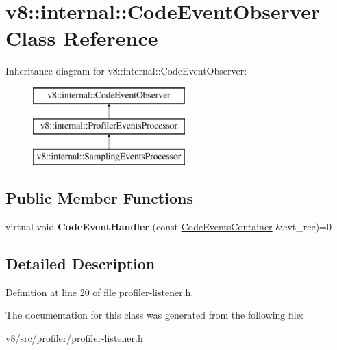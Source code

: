 \hypertarget{classv8_1_1internal_1_1CodeEventObserver}{}\section{v8\+:\+:internal\+:\+:Code\+Event\+Observer Class Reference}
\label{classv8_1_1internal_1_1CodeEventObserver}
Inheritance diagram for v8\+:\+:internal\+:\+:Code\+Event\+Observer\+:\begin{figure}[H]
\begin{center}
\leavevmode
\includegraphics[height=3.000000cm]{classv8_1_1internal_1_1CodeEventObserver}
\end{center}
\end{figure}
\subsection*{Public Member Functions}
\begin{DoxyCompactItemize}
\item 
\mbox{\label{classv8_1_1internal_1_1CodeEventObserver_a8fb166e41cebe25a1a7b65f35671a6c8}} 
virtual void {\bfseries Code\+Event\+Handler} (const \mbox{\hyperlink{classv8_1_1internal_1_1CodeEventsContainer}{Code\+Events\+Container}} \&evt\+\_\+rec)=0
\end{DoxyCompactItemize}


\subsection{Detailed Description}


Definition at line 20 of file profiler-\/listener.\+h.



The documentation for this class was generated from the following file\+:\begin{DoxyCompactItemize}
\item 
v8/src/profiler/profiler-\/listener.\+h\end{DoxyCompactItemize}
